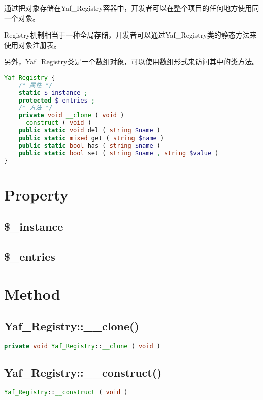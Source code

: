通过把对象存储在Yaf\_Registry容器中，开发者可以在整个项目的任何地方使用同一个对象。

Registry机制相当于一种全局存储，开发者可以通过Yaf\_Registry类的静态方法来使用对象注册表。

另外，Yaf\_Registry类是一个数组对象，可以使用数组形式来访问其中的类方法。

\begin{lstlisting}[language=PHP]
Yaf_Registry {
    /* 属性 */
    static $_instance ;
    protected $_entries ;
    /* 方法 */
    private void __clone ( void )
    __construct ( void )
    public static void del ( string $name )
    public static mixed get ( string $name )
    public static bool has ( string $name )
    public static bool set ( string $name , string $value )
}
\end{lstlisting}

\section{Property}

\subsection{\$\_instance}


\subsection{\$\_entries}


\section{Method}


\subsection{Yaf\_Registry::\_\_clone()}




\begin{lstlisting}[language=PHP]
private void Yaf_Registry::__clone ( void )
\end{lstlisting}


\subsection{Yaf\_Registry::\_\_construct()}


\begin{lstlisting}[language=PHP]
Yaf_Registry::__construct ( void )
\end{lstlisting}

